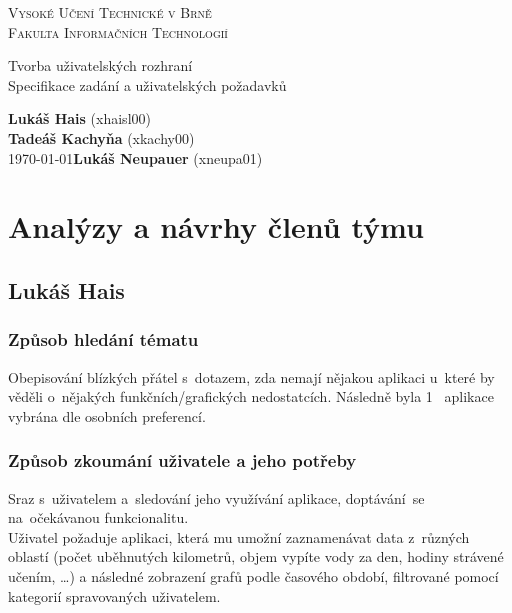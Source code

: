 \documentclass[12pt, titlepage]{article}
\begin{document}
\begin{titlepage}
    \begin{center}
        \textsc{\Huge{Vysoké Učení Technické v Brně\\[0.3em]}}
        \textsc{\huge{Fakulta Informačních Technologií}}
        
        
        \LARGE{Tvorba uživatelských rozhraní\\}
        \Huge{Specifikace zadání a uživatelských požadavků}
        
    \end{center}
    {\Large \phantom{} \hfill \textbf{Lukáš Hais} (xhaisl00)\\
		\phantom{} \hfill \textbf{Tadeáš Kachyňa} (xkachy00)\\
		\today \hfill \textbf{Lukáš Neupauer} (xneupa01)}
\end{titlepage}

\tableofcontents
\newpage




\section{Analýzy a návrhy členů týmu}
\subsection{Lukáš Hais}
	\subsubsection{Způsob hledání tématu}
Obepisování blízkých přátel s~dotazem, zda nemají nějakou aplikaci u~které by věděli o~nějakých funkčních/grafických nedostatcích. Následně byla 1~
aplikace vybrána dle osobních preferencí.

	\subsubsection{Způsob zkoumání uživatele a jeho potřeby}
Sraz s~uživatelem a~sledování jeho využívání aplikace, doptávání~se na~očekávanou funkcionalitu.\\
Uživatel požaduje aplikaci, která mu umožní zaznamenávat data z~různých oblastí (počet uběhnutých kilometrů, objem vypíte vody za den, hodiny strávené učením,  \ldots) a následné zobrazení grafů podle časového období, filtrované pomocí kategorií spravovaných uživatelem.
\end{document}
